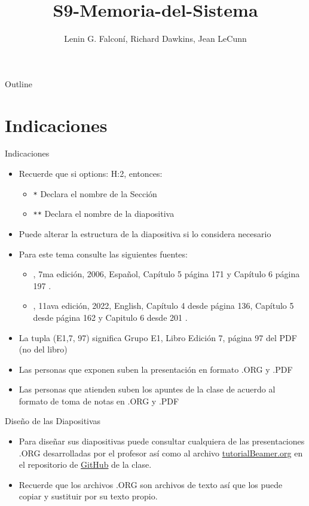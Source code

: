 \documentclass[presentation]{beamer}
\author{Lenin G. Falconí, Richard Dawkins, Jean LeCunn}
\date{}
\title{S9-Memoria-del-Sistema}
\begin{document}
\maketitle
\begin{frame}{Outline}
\tableofcontents
\end{frame}



\section{Indicaciones}
\label{sec:orga2a8dde}
\begin{frame}{Indicaciones}
 \begin{itemize}
\item Recuerde que si options: H:2, entonces: 
\begin{itemize}
\item \texttt{*} Declara el nombre de la Sección
\item \texttt{**} Declara el nombre de la diapositiva
\end{itemize}
\item Puede alterar la estructura de la diapositiva si lo considera
necesario
\item Para este tema consulte las siguientes fuentes:
\begin{itemize}
\item \textcite{stallings2006}, 7ma edición, 2006, Español, Capítulo 5
página 171 y Capítulo 6 página 197 \autocite{stallings2006}.
\item \textcite{stallings2022computer}, 11ava edición, 2022, English,
Capítulo 4 desde página 136, Capítulo 5 desde página 162 y Capitulo
6 desde 201 \autocite{stallings2022computer}.
\end{itemize}
\item La tupla (E1,7, 97) significa Grupo E1, Libro Edición 7, página 97
del PDF (no del libro)
\item Las personas que exponen suben la presentación en formato .ORG y
.PDF
\item Las personas que atienden suben los apuntes de la clase de acuerdo al
formato de toma de notas en .ORG y .PDF
\end{itemize}
\end{frame}
\begin{frame}[label={sec:org1d8aa3f}]{Diseño de las Diapositivas}
\begin{itemize}
\item Para diseñar sus diapositivas puede consultar cualquiera de las
presentaciones .ORG desarrolladas por el profesor así como al
archivo \href{https://github.com/LeninGF/EPN-Lectures/blob/main/iccd332ArqComp-2024-B/Tutoriales/Beamer-Emacs/tutorialBeamer.org}{tutorialBeamer.org} en el repositorio de \href{https://github.com/LeninGF/EPN-Lectures/blob/main/iccd332ArqComp-2024-B/Tutoriales/Beamer-Emacs/tutorialBeamer.org}{GitHub} de la clase.
\item Recuerde que los archivos .ORG son archivos de texto así que los
puede copiar y sustituir por su texto propio.
\end{itemize}
\end{frame}
\end{document}
